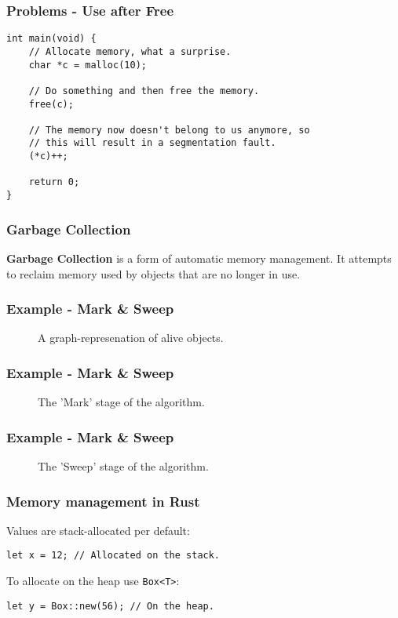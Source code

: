 \documentclass{beamer}
\begin{document}



\begin{frame}[fragile]
	\frametitle{Problems - Use after Free}
	\begin{verbatim}
int main(void) {
	// Allocate memory, what a surprise.
	char *c = malloc(10);

	// Do something and then free the memory.
	free(c);

	// The memory now doesn't belong to us anymore, so 
	// this will result in a segmentation fault.
	(*c)++;

	return 0;
}
	\end{verbatim}
\end{frame}
\begin{frame}
	\frametitle{Garbage Collection}
	\textbf{Garbage Collection} is a form of automatic memory management. It attempts to reclaim memory used by objects that are no longer in use.
\end{frame}
\begin{frame}
	\frametitle{Example - Mark \& Sweep}
	\begin{figure}
		\centering
		\def\svgwidth{230pt}
		
		\caption{A graph-represenation of alive objects.}
	\end{figure}
\end{frame}
\begin{frame}
	\frametitle{Example - Mark \& Sweep}
	\begin{figure}
		\centering
		\def\svgwidth{230pt}
		
		\caption{The 'Mark' stage of the algorithm.}
	\end{figure}
\end{frame}
\begin{frame}
	\frametitle{Example - Mark \& Sweep}
	\begin{figure}
		\centering
		\def\svgwidth{230pt}
		
		\caption{The 'Sweep' stage of the algorithm.}
	\end{figure}
\end{frame}
\begin{frame}[fragile]
	\frametitle{Memory management in Rust}
	Values are stack-allocated per default:
	\begin{verbatim}
let x = 12; // Allocated on the stack.
	\end{verbatim}
	\vspace{1em}
	To allocate on the heap use \texttt{Box<T>}:
	\begin{verbatim}
let y = Box::new(56); // On the heap.
	\end{verbatim}
\end{frame}
\end{document}
